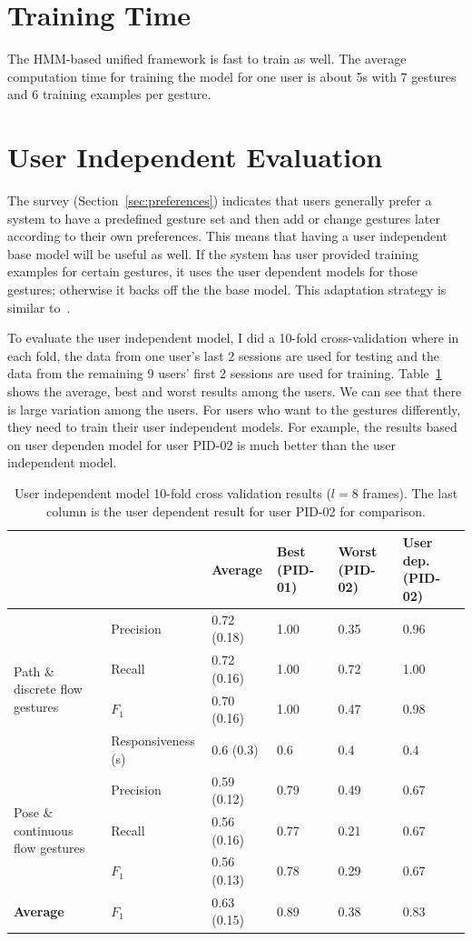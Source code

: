 \section{Training Time}
The HMM-based unified framework is fast to train as well. The average
computation time for training the model for one user is about 5s with 7 gestures and 6 training examples per
gesture. 

\section{User Independent Evaluation}
The survey (Section~\ref{sec:preferences}) indicates that users
generally prefer a system to have a predefined gesture set and then add or
change gestures later according to their own preferences. This means that having
a user independent base model will be useful as well. If the system has user
provided training examples for certain gestures, it uses the
user dependent models for those gestures; otherwise it backs off the the base
model. This adaptation strategy is similar to~\cite{yin13-making}.

To evaluate the user independent model, I did a 10-fold cross-validation where
in each fold, the data from one user's last 2 sessions are used for testing and
the data from the remaining 9 users' first 2 sessions are used for training.
Table~\ref{tab:user-independent} shows the average, best and worst results among
the users. We can see that there is large variation among the users. For users
who want to the gestures differently, they need to train their user independent
models. For example, the results based on user dependen model for user PID-02 is
much better than the user independent model.

\begin{table}[tbh]
\centering
\begin{tabular}{|p{3cm}|l|l|p{1.9cm}|p{1.9cm}||p{2cm}|}
\hline
& & \textbf{Average} & \textbf{Best (PID-01)} & \textbf{Worst (PID-02)} &
\textbf{User dep. (PID-02)} \\
\hline
\multirow{4}{3cm}{Path \& discrete flow gestures} 
& Precision & 0.72 (0.18) & 1.00 & 0.35 & 0.96 \\
\cline{2-6}
& Recall    & 0.72 (0.16) & 1.00 & 0.72 & 1.00\\
\cline{2-6}
& $F_1$ & 0.70 (0.16) & 1.00 & 0.47 & 0.98 \\
\cline{2-6}
& Responsiveness (s) & 0.6 (0.3)  & 0.6 & 0.4 &  0.4\\
\hline
\multirow{3}{3cm}{Pose \& continuous flow gestures}
& Precision & 0.59 (0.12) & 0.79 & 0.49 & 0.67\\
\cline{2-6}
& Recall & 0.56 (0.16) & 0.77 & 0.21 & 0.67\\
\cline{2-6}
& $F_1$ & 0.56 (0.13)  & 0.78 & 0.29 & 0.67\\
\hline
\textbf{Average} & $F_1$ & 0.63 (0.15) & 0.89 & 0.38 & 0.83\\
\hline
\end{tabular}
\caption{User independent model 10-fold cross validation results ($l = 8$
frames). The last column is the user dependent result for user PID-02 for
comparison.}
\label{tab:user-independent}
\end{table}

